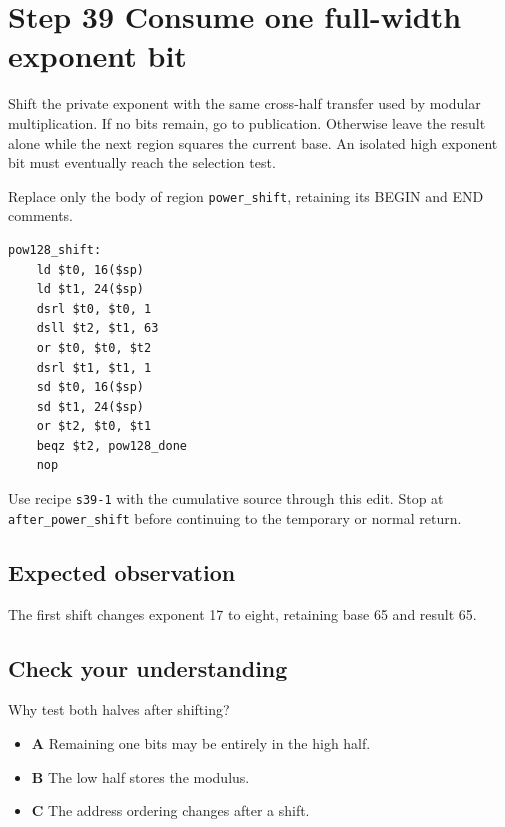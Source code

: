 \section{Step 39 Consume one full-width exponent bit}\label{rsa-s39}

Shift the private exponent with the same cross-half transfer used by modular multiplication. If no bits remain, go to publication. Otherwise leave the result alone while the next region squares the current base. An isolated high exponent bit must eventually reach the selection test.

Replace only the body of region \texttt{power\_shift}, retaining its BEGIN and END comments.

\begin{verbatim}
pow128_shift:
    ld $t0, 16($sp)
    ld $t1, 24($sp)
    dsrl $t0, $t0, 1
    dsll $t2, $t1, 63
    or $t0, $t0, $t2
    dsrl $t1, $t1, 1
    sd $t0, 16($sp)
    sd $t1, 24($sp)
    or $t2, $t0, $t1
    beqz $t2, pow128_done
    nop
\end{verbatim}

Use recipe \texttt{s39-1} with the cumulative source through this edit. Stop at \texttt{after\_power\_shift} before continuing to the temporary or normal return.

\subsection{Expected observation}
The first shift changes exponent 17 to eight, retaining base 65 and result 65.

\subsection{Check your understanding}
Why test both halves after shifting?

\begin{itemize}
\item \textbf{A} Remaining one bits may be entirely in the high half.
\item \textbf{B} The low half stores the modulus.
\item \textbf{C} The address ordering changes after a shift.
\end{itemize}
